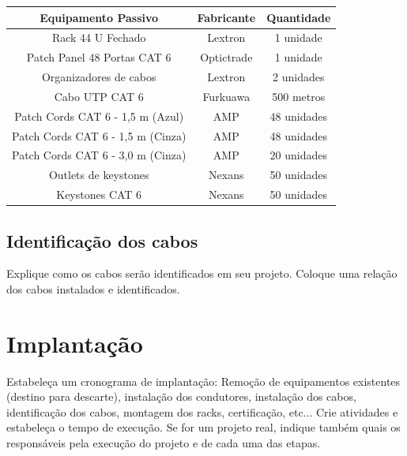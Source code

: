 \documentclass[	DIV=calc,%
							paper=a4,%
							fontsize=12pt,%
							onecolumn]{scrartcl}	 					%
\begin{document}
\begin{center}
	\renewcommand{\arraystretch}{1.5}
	\begin{tabular}{|c|c|c|}
		\hline
		\textbf{Equipamento Passivo}      & \textbf{Fabricante} & \multicolumn{1}{l|}{\textbf{Quantidade}} \\ \hline
		Rack 44 U Fechado                 & Lextron             & 1 unidade                                \\ \hline
		Patch Panel 48 Portas CAT 6       & Optictrade          & 1 unidade                                \\ \hline
		Organizadores de cabos            & Lextron             & 2 unidades                               \\ \hline
		Cabo UTP CAT 6                    & Furkuawa            & 500 metros                               \\ \hline
		Patch Cords CAT 6 - 1,5 m (Azul)  & AMP                 & 48 unidades                              \\ \hline
		Patch Cords CAT 6 - 1,5 m (Cinza) & AMP                 & 48 unidades                              \\ \hline
		Patch Cords CAT 6 - 3,0 m (Cinza) & AMP                 & 20 unidades                              \\ \hline
		Outlets de keystones              & Nexans              & 50 unidades                              \\ \hline
		Keystones CAT 6                   & Nexans              & 50 unidades                              \\ \hline
	\end{tabular}
\end{center}	

\subsection{Identificação dos cabos}
Explique como os cabos serão identificados em seu projeto. Coloque uma relação dos cabos instalados e identificados.

\section{Implantação}
Estabeleça um cronograma de implantação:
Remoção de equipamentos existentes (destino para descarte), instalação dos condutores, instalação dos cabos, 
identificação dos cabos, montagem dos racks, certificação, etc... Crie atividades e estabeleça o tempo de execução. Se for um projeto real, indique também quais os responsáveis pela execução do projeto e de cada uma das etapas.
\end{document}
